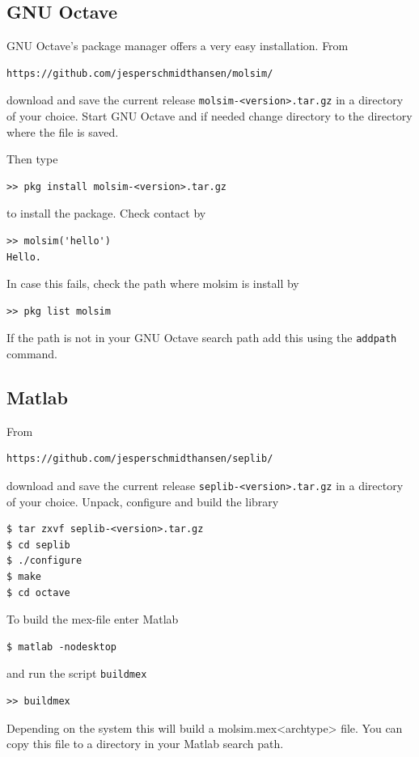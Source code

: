 \documentclass[11pt]{article}
\begin{document}
\subsection{GNU Octave}
GNU Octave's package manager offers a very easy installation. From

\begin{verbatim}
https://github.com/jesperschmidthansen/molsim/
\end{verbatim}

\noindent download and save the current release
\verb!molsim-<version>.tar.gz! in a directory of your choice. Start GNU
Octave and if needed change directory to the directory where the file is saved.

\noindent Then type
\begin{verbatim}
>> pkg install molsim-<version>.tar.gz 
\end{verbatim}
to install the package. Check contact by
\begin{verbatim}
>> molsim('hello')
Hello. 
\end{verbatim}
In case this fails, check the path where \textsf{molsim} is install by
\begin{verbatim}
>> pkg list molsim
\end{verbatim}
If the path is not in your GNU Octave search path add this using the
\verb!addpath! command.

\subsection{Matlab}
From
\begin{verbatim}
https://github.com/jesperschmidthansen/seplib/
\end{verbatim}
\noindent download and save the current release \verb!seplib-<version>.tar.gz!
in a directory of your choice. Unpack, configure and build the library
\begin{verbatim}
$ tar zxvf seplib-<version>.tar.gz
$ cd seplib
$ ./configure
$ make
$ cd octave
\end{verbatim}
To build the \textsf{mex}-file enter Matlab
\begin{verbatim}
$ matlab -nodesktop
\end{verbatim}
and run the script \verb!buildmex!
\begin{verbatim}
>> buildmex
\end{verbatim}
Depending on the system this will build a \textsf{molsim.mex<archtype>}
file. You can copy this file to a directory in your Matlab search path.
\end{document}
